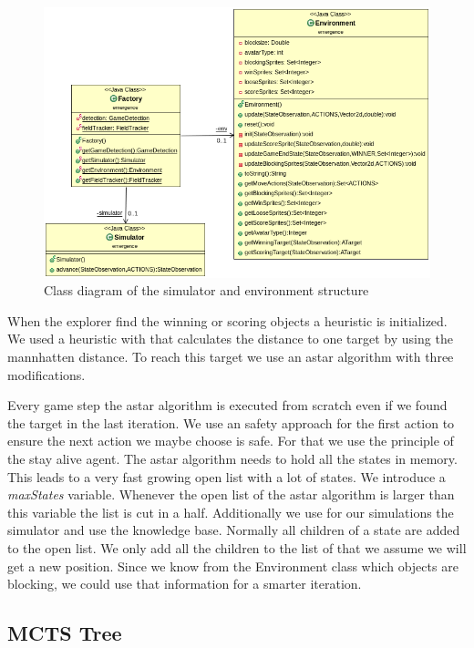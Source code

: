 \begin{figure}
\centering
\includegraphics[scale=0.5]{images/classes.png}
\caption{Class diagram of the simulator and environment structure}
\label{fig:sim_classes}
\end{figure}


When the explorer find the winning or scoring objects a heuristic is initialized. We used a heuristic with that 
calculates the distance to one target by using the mannhatten distance. To reach this target we use an astar 
algorithm with three modifications.

Every game step the astar algorithm is executed from scratch even if we found the target in the last iteration.
We use an safety approach for the first action to ensure the next action we maybe choose is safe. For that we
use the principle of the stay alive agent. The astar algorithm needs to hold all the states in memory.
This leads to a very fast growing open list with a lot of states. We introduce a \textit{maxStates} variable. 
Whenever the open list of the astar algorithm is larger than this variable the list is cut in a half.
Additionally we use for our simulations the simulator and use the knowledge base. Normally all children of
a state are added to the open list. We only add all the children to the list of that we assume we will get a 
new position. Since we know from the Environment class which objects are blocking, we could use that information
for a smarter iteration.


\subsection{MCTS Tree} 

